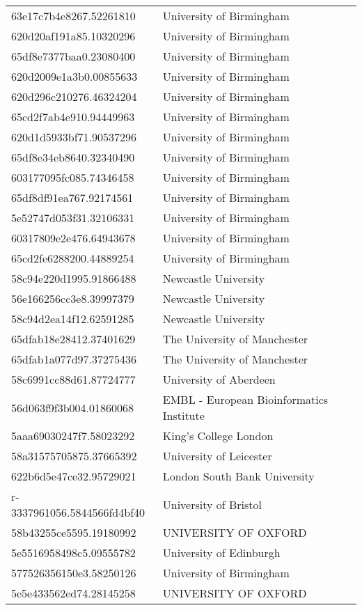 \begin{tabular}{ll}
63e17c7b4e8267.52261810 & University of Birmingham \\
620d20af191a85.10320296 & University of Birmingham \\
65df8e7377baa0.23080400 & University of Birmingham \\
620d2009e1a3b0.00855633 & University of Birmingham \\
620d296c210276.46324204 & University of Birmingham \\
65cd2f7ab4e910.94449963 & University of Birmingham \\
620d1d5933bf71.90537296 & University of Birmingham \\
65df8e34eb8640.32340490 & University of Birmingham \\
603177095fc085.74346458 & University of Birmingham \\
65df8df91ea767.92174561 & University of Birmingham \\
5e52747d053f31.32106331 & University of Birmingham \\
60317809e2e476.64943678 & University of Birmingham \\
65cd2fe6288200.44889254 & University of Birmingham \\
58c94e220d1995.91866488 & Newcastle University \\
56e166256cc3e8.39997379 & Newcastle University \\
58c94d2ea14f12.62591285 & Newcastle University \\
65dfab18e28412.37401629 & The University of Manchester \\
65dfab1a077d97.37275436 & The University of Manchester \\
58c6991cc88d61.87724777 & University of Aberdeen \\
56d063f9f3b004.01860068 & EMBL - European Bioinformatics Institute \\
5aaa69030247f7.58023292 & King's College London \\
58a31575705875.37665392 & University of Leicester \\
622b6d5e47ce32.95729021 & London South Bank University \\
r-3337961056.5844566fd4bf40 & University of Bristol \\
58b43255ce5595.19180992 & UNIVERSITY OF OXFORD \\
5e5516958498c5.09555782 & University of Edinburgh \\
577526356150e3.58250126 & University of Birmingham \\
5e5e433562ed74.28145258 & UNIVERSITY OF OXFORD \\

\end{tabular}

